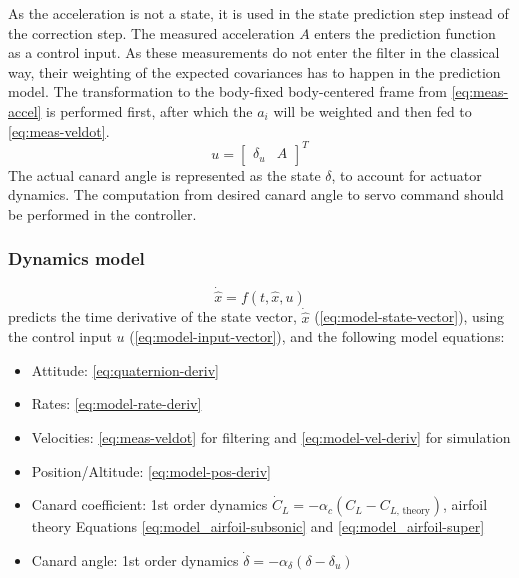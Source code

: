 As the acceleration is not a state, %
it is used in the state prediction step instead of the correction step. 
The measured acceleration $A$ enters the prediction function as a control input.
As these measurements do not enter the filter in the classical way, their weighting of the expected covariances has to happen in the prediction model.
The transformation to the body-fixed body-centered frame from \autoref{eq:meas-accel} is performed first, after which the $a_i$ will be weighted and then fed to \autoref{eq:meas-veldot}.
\begin{equation}
    u =  \begin{bmatrix}
    \delta_u & A
    \end{bmatrix}^T
    \label{eq:model-input-vector}
\end{equation}
The actual canard angle is represented as the state $\delta$, to account for actuator dynamics.
The computation from desired canard angle to servo command should be performed in the controller. 

\subsubsection{Dynamics model}
\begin{equation}
    \dot{\hat x} = f(t, \hat x, u) \nonumber
\end{equation}
predicts the time derivative of the state vector, $\dot{\hat x}$ (\autoref{eq:model-state-vector}), using the control input $u$ (\autoref{eq:model-input-vector}), and the following model equations:
\begin{itemize}
    \item Attitude: \ref{eq:quaternion-deriv}
    \item Rates: \ref{eq:model-rate-deriv}
    \item Velocities: \ref{eq:meas-veldot} for filtering and \ref{eq:model-vel-deriv} for simulation
    \item Position/Altitude: \ref{eq:model-pos-deriv}
    \item Canard coefficient: 1st order dynamics $\dot C_L = -\alpha_c (C_L - C_{L\text{, theory}})$, airfoil theory Equations \ref{eq:model_airfoil-subsonic} and \ref{eq:model_airfoil-super}
    \item Canard angle: 1st order dynamics $\dot \delta = -\alpha_\delta (\delta - \delta_u)$
\end{itemize}

